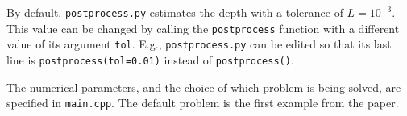 \documentclass[entropy,article,accept,oneauthor,pdftex,10pt,a4paper]{mdpi}
\begin{document}
By default, {\tt postprocess.py} estimates the depth with a tolerance of
$L=10^{-3}$. This value can be changed by calling the {\tt postprocess}
function with a different value of its argument {\tt tol}. E.g.,
{\tt postprocess.py} can be edited so that its last line is
{\tt postprocess(tol=0.01)} instead of {\tt postprocess()}.

The numerical parameters, and the choice of which problem is being solved,
are specified in {\tt main.cpp}. The default problem is the first example
from the paper.


%

\end{document}
